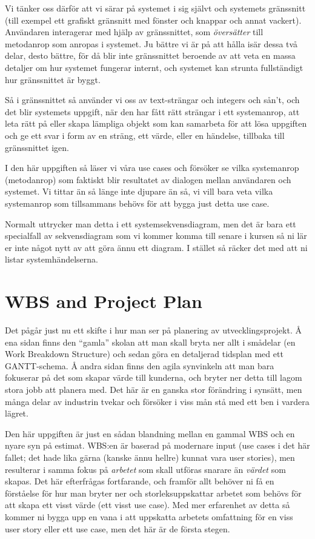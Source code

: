 \documentclass[8pt,oneside]{memoir}
\begin{document}
Vi tänker oss därför att vi särar på systemet i sig självt och systemets gränssnitt (till exempel ett grafiskt gränsnitt med fönster och knappar och annat vackert). Användaren interagerar med hjälp av gränssnittet, som \emph{översätter} till metodanrop som anropas i systemet. Ju bättre vi är på att hålla isär dessa två delar, desto bättre, för då blir inte gränssnittet beroende av att veta en massa detaljer om hur systemet fungerar internt, och systemet kan strunta fullständigt hur gränssnittet är byggt.

Så i gränssnittet så använder vi oss av text-strängar och integers och sån't, och det blir systemets uppgift, när den har fått rätt strängar i ett systemanrop, att leta rätt på eller skapa lämpliga objekt som kan samarbeta för att lösa uppgiften och ge ett svar i form av en sträng, ett värde, eller en händelse, tillbaka till gränssnittet igen.

I den här uppgiften så läser vi våra use cases och försöker se vilka systemanrop (metodanrop) som faktiskt blir resultatet av dialogen mellan användaren och systemet. Vi tittar än så länge inte djupare än så, vi vill bara veta vilka systemanrop som tillsammans behövs för att bygga just detta use case.

Normalt uttrycker man detta i ett systemsekvensdiagram, men det är bara ett specialfall av sekvensdiagram som vi kommer komma till senare i kursen så ni lär er inte något nytt av att göra ännu ett diagram. I stället så räcker det med att ni listar systemhändelserna.
\chapter{WBS and Project Plan}
\label{sec:orgde7965c}
Det pågår just nu ett skifte i hur man ser på planering av utvecklingsprojekt. Å ena sidan finns den ``gamla'' skolan att man skall bryta ner allt i smådelar (en Work Breakdown Structure) och sedan göra en detaljerad tidsplan med ett GANTT-schema. Å andra sidan finns den agila synvinkeln att man bara fokuserar på det som skapar värde till kunderna, och bryter ner detta till lagom stora jobb att planera med. Det här är en ganska stor förändring i synsätt, men många delar av industrin tvekar och försöker i viss mån stå med ett ben i vardera lägret.

Den här uppgiften är just en sådan blandning mellan en gammal WBS och en nyare syn på estimat. WBS:en är baserad på modernare input (use cases i det här fallet; det hade lika gärna (kanske ännu hellre) kunnat vara user stories), men resulterar i samma fokus på \emph{arbetet} som skall utföras snarare än \emph{värdet} som skapas. Det här efterfrågas fortfarande, och framför allt behöver ni få en förståelse för hur man bryter ner och storleksuppskattar arbetet som behövs för att skapa ett visst värde (ett visst use case). Med mer erfarenhet av detta så kommer ni bygga upp en vana i att uppskatta arbetets omfattning för en viss user story eller ett use case, men det här är de första stegen.
\end{document}
